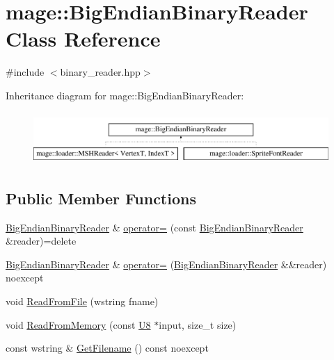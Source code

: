 \hypertarget{classmage_1_1_big_endian_binary_reader}{}\section{mage\+:\+:Big\+Endian\+Binary\+Reader Class Reference}
\label{classmage_1_1_big_endian_binary_reader}


{\ttfamily \#include $<$binary\+\_\+reader.\+hpp$>$}

Inheritance diagram for mage\+:\+:Big\+Endian\+Binary\+Reader\+:\begin{figure}[H]
\begin{center}
\leavevmode
\includegraphics[height=1.992882cm]{classmage_1_1_big_endian_binary_reader}
\end{center}
\end{figure}
\subsection*{Public Member Functions}
\begin{DoxyCompactItemize}
\item 
\hyperlink{classmage_1_1_big_endian_binary_reader}{Big\+Endian\+Binary\+Reader} \& \hyperlink{classmage_1_1_big_endian_binary_reader_abd4b24df4219469a8c2e9253b1cad405}{operator=} (const \hyperlink{classmage_1_1_big_endian_binary_reader}{Big\+Endian\+Binary\+Reader} \&reader)=delete
\item 
\hyperlink{classmage_1_1_big_endian_binary_reader}{Big\+Endian\+Binary\+Reader} \& \hyperlink{classmage_1_1_big_endian_binary_reader_ac37539cb08ea9278daf5628a0c5895d8}{operator=} (\hyperlink{classmage_1_1_big_endian_binary_reader}{Big\+Endian\+Binary\+Reader} \&\&reader) noexcept
\item 
void \hyperlink{classmage_1_1_big_endian_binary_reader_a68db676feaa42c1c3a9bf16d0680b04f}{Read\+From\+File} (wstring fname)
\item 
void \hyperlink{classmage_1_1_big_endian_binary_reader_a44d2529136499412cdaf9ad5d1cf0e59}{Read\+From\+Memory} (const \hyperlink{namespacemage_afc638980bc6154f15af5e2d93a0e0ea9}{U8} $\ast$input, size\+\_\+t size)
\item 
const wstring \& \hyperlink{classmage_1_1_big_endian_binary_reader_a801558f27606dbc681809178aaaaacd1}{Get\+Filename} () const noexcept
\end{DoxyCompactItemize}
